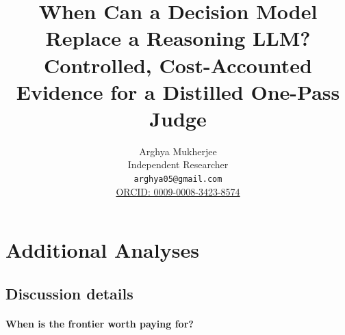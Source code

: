 \documentclass{article}
\title{When Can a Decision Model Replace a Reasoning LLM?\\ Controlled, Cost-Accounted Evidence for a Distilled One-Pass Judge}
\author{Arghya Mukherjee\\Independent Researcher\\\texttt{arghya05@gmail.com}\\
\href{https://orcid.org/0009-0008-3423-8574}{ORCID: 0009-0008-3423-8574}}
\begin{document}
\raggedbottom
\maketitle





\FloatBarrier

\FloatBarrier

\FloatBarrier

\FloatBarrier

\FloatBarrier




\appendix
\section{Additional Analyses}
\label{app:additional}















\subsection{Discussion details}


\paragraph{When is the frontier worth paying for?}


\FloatBarrier


\end{document}
